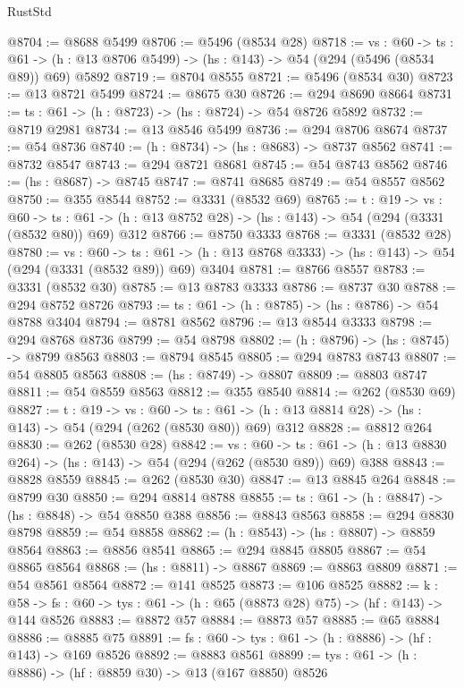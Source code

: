 \begin{lexlean}{RustStd}
\begin{coremodule}
@8704 := @8688 @5499
@8706 := @5496 (@8534 @28)
@8718 := {vs : @60} ->
  {ts : @61} -> (h : @13 @8706 @5499) -> (hs : @143) -> @54 (@294 (@5496 (@8534 @89)) @69) @5892
@8719 := @8704 @8555
@8721 := @5496 (@8534 @30)
@8723 := @13 @8721 @5499
@8724 := @8675 @30
@8726 := @294 @8690 @8664
@8731 := {ts : @61} -> (h : @8723) -> (hs : @8724) -> @54 @8726 @5892
@8732 := @8719 @2981
@8734 := @13 @8546 @5499
@8736 := @294 @8706 @8674
@8737 := @54 @8736
@8740 := (h : @8734) -> (hs : @8683) -> @8737 @8562
@8741 := @8732 @8547
@8743 := @294 @8721 @8681
@8745 := @54 @8743 @8562
@8746 := (hs : @8687) -> @8745
@8747 := @8741 @8685
@8749 := @54 @8557 @8562
@8750 := @355 @8544
@8752 := @3331 (@8532 @69)
@8765 := {t : @19} ->
  {vs : @60} ->
  {ts : @61} -> (h : @13 @8752 @28) -> (hs : @143) -> @54 (@294 (@3331 (@8532 @80)) @69) @312
@8766 := @8750 @3333
@8768 := @3331 (@8532 @28)
@8780 := {vs : @60} ->
  {ts : @61} -> (h : @13 @8768 @3333) -> (hs : @143) -> @54 (@294 (@3331 (@8532 @89)) @69) @3404
@8781 := @8766 @8557
@8783 := @3331 (@8532 @30)
@8785 := @13 @8783 @3333
@8786 := @8737 @30
@8788 := @294 @8752 @8726
@8793 := {ts : @61} -> (h : @8785) -> (hs : @8786) -> @54 @8788 @3404
@8794 := @8781 @8562
@8796 := @13 @8544 @3333
@8798 := @294 @8768 @8736
@8799 := @54 @8798
@8802 := (h : @8796) -> (hs : @8745) -> @8799 @8563
@8803 := @8794 @8545
@8805 := @294 @8783 @8743
@8807 := @54 @8805 @8563
@8808 := (hs : @8749) -> @8807
@8809 := @8803 @8747
@8811 := @54 @8559 @8563
@8812 := @355 @8540
@8814 := @262 (@8530 @69)
@8827 := {t : @19} ->
  {vs : @60} ->
  {ts : @61} -> (h : @13 @8814 @28) -> (hs : @143) -> @54 (@294 (@262 (@8530 @80)) @69) @312
@8828 := @8812 @264
@8830 := @262 (@8530 @28)
@8842 := {vs : @60} ->
  {ts : @61} -> (h : @13 @8830 @264) -> (hs : @143) -> @54 (@294 (@262 (@8530 @89)) @69) @388
@8843 := @8828 @8559
@8845 := @262 (@8530 @30)
@8847 := @13 @8845 @264
@8848 := @8799 @30
@8850 := @294 @8814 @8788
@8855 := {ts : @61} -> (h : @8847) -> (hs : @8848) -> @54 @8850 @388
@8856 := @8843 @8563
@8858 := @294 @8830 @8798
@8859 := @54 @8858
@8862 := (h : @8543) -> (hs : @8807) -> @8859 @8564
@8863 := @8856 @8541
@8865 := @294 @8845 @8805
@8867 := @54 @8865 @8564
@8868 := (hs : @8811) -> @8867
@8869 := @8863 @8809
@8871 := @54 @8561 @8564
@8872 := @141 @8525
@8873 := @106 @8525
@8882 := {k : @58} ->
  {fs : @60} -> {tys : @61} -> (h : @65 (@8873 @28) @75) -> (hf : @143) -> @144 @8526
@8883 := @8872 @57
@8884 := @8873 @57
@8885 := @65 @8884
@8886 := @8885 @75
@8891 := {fs : @60} -> {tys : @61} -> (h : @8886) -> (hf : @143) -> @169 @8526
@8892 := @8883 @8561
@8899 := {tys : @61} -> (h : @8886) -> (hf : @8859 @30) -> @13 (@167 @8850) @8526

\end{coremodule}
\end{lexlean}
